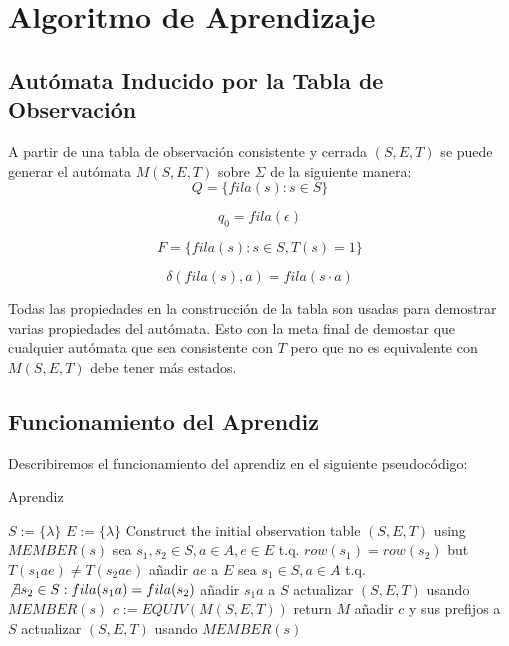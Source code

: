 \documentclass[12pt]{amsart}
\begin{document}
\section{Algoritmo de Aprendizaje}

\subsection{Autómata Inducido por la Tabla de Observación}

A partir de una tabla de observación consistente y cerrada $(S,E,T)$ se puede generar el autómata $M(S,E,T)$ sobre $\Sigma$ de la siguiente manera: \\

\[ Q = \{ fila(s): s \in S \} \]

\[ q_0 = fila(\epsilon) \]

\[ F = \{ fila(s): s \in S, T(s) = 1 \} \]

\[ \delta(fila(s),a) = fila(s \cdot a) \]

Todas las propiedades en la construcción de la tabla son usadas para demostrar varias propiedades del autómata. Esto con la meta final de demostar que cualquier autómata que sea consistente con $T$ pero que no es equivalente con $M(S,E,T)$ debe tener más estados.

\subsection{Funcionamiento del Aprendiz}

Describiremos el funcionamiento del aprendiz en el siguiente pseudocódigo:

\begin{algorithm}
\caption{Aprendiz}
\begin{algorithmic}[1]
\State $S := \{ \lambda \}$
\State $E := \{ \lambda \}$
\State Construct the initial observation table $(S,E,T)$ using $MEMBER(s)$
            \State sea $s_1, s_2 \in S, a \in A, e \in E$ t.q. $row(s_1) = row(s_2)$ but $T(s_1 a e) \neq T(s_2 a e)$
            \State añadir $ae$ a $E$
        \Else
            \State sea $s_1 \in S, a \in A$ t.q. $\not\exists s_2 \in S: fila(s_1 a) = fila(s_2)$
            \State añadir $s_1 a$ a $S$
        \EndIf
        \State actualizar $(S,E,T)$ usando $MEMBER(s)$
    \EndWhile
    \State $c := EQUIV(M(S,E,T))$
        \State return $M$
    \Else
        \State añadir $c$ y sus prefijos a $S$
        \State actualizar $(S,E,T)$ usando $MEMBER(s)$
    \EndIf
\EndWhile
\end{algorithmic}
\end{algorithm}
\end{document}

